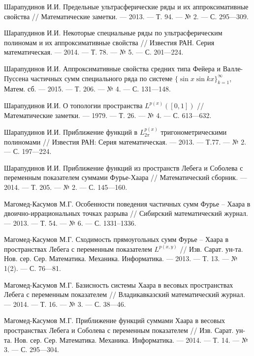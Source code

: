 \begin{thebibliography}{111}


Шарапудинов И.И. Предельные ультрасферические ряды и их
аппроксимативные свойства // Математические заметки. --- 2013. --- Т. 94. --- № 2. --- С. 295---309.

Шарапудинов И.И. Некоторые специальные ряды по ультрасферическим полиномам  и их аппроксимативные свойства //
Известия РАН. Серия математическая. --- 2014. --- Т. 78. --- № 5. --- С. 201---224.

Шарапудинов И.И. Аппроксимативные свойства средних типа Фейера и Валле-Пуссена частичных сумм специального ряда по системе $\{ \sin x\sin kx\}_{k=1}^\infty$, Матем. сб. --- 2015. --- Т. 206. --- № 4. --- С. 131---148.

Шарапудинов И.И. О топологии пространства
$ L^{p(x)}([0,1])$ // Математические заметки. --- 1979. --- Т. 26. --- № 4. --- С. 613---632.

Шарапудинов И.И. Приближение функций в $L^{p(x)}_{2\pi}$ тригонометрическими полиномами // Известия РАН: Серия математическая. --- 2013. --- Т.77. --- № 2. --- С. 197---224.




Шарапудинов И.И. Приближение функций из пространств Лебега и Соболева с переменным показателем суммами Фурье-Хаара // Математический сборник. --- 2014. --- Т. 205. --- № 2. --- С. 145---160.

Магомед-Касумов М.Г. Особенности поведения частичных сумм Фурье -- Хаара в двоично-иррациональных точках разрыва // Сибирский математический журнал. --- 2013. --- Т. 54. --- № 6. --- С. 1331--1336.




Магомед-Касумов М.Г. Сходимость	прямоугольных сумм Фурье -- Хаара в	пространствах Лебега с переменным показателем $L^{p(x,y)}$ // Изв. Сарат. ун-та. Нов. сер. Сер. Математика. Механика. Информатика. --- 2013. --- Т. 13. --- № 1(2). --- С. 76---81.




Магомед-Касумов М.Г. Базисность системы	Хаара в весовых пространствах Лебега с переменным показателем // Владикавказский 	математический журнал. --- 2014. --- Т. 16. --- № 3. --- С. 38---46.




Магомед-Касумов М.Г. Приближение функций суммами Хаара в весовых пространствах Лебега и Соболева с переменным показателем // Изв. Сарат. ун-та. Нов. сер.	Сер. Математика. Механика. Информатика. --- 2014. --- Т. 14. --- № 3. --- С. 295---304.





\end{thebibliography}

